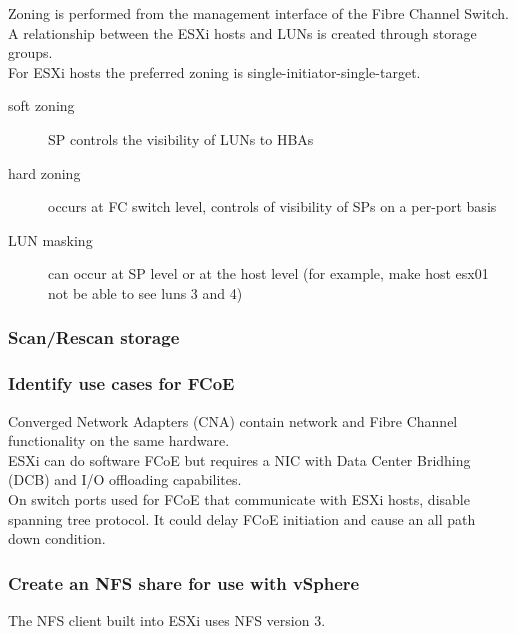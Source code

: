 Zoning is performed from the management interface of the Fibre Channel Switch.\\

A relationship between the ESXi hosts and LUNs is created through storage
groups.\\

For ESXi hosts the preferred zoning is single-initiator-single-target.

\begin{description}

\item[soft zoning]
SP controls the visibility of LUNs to HBAs

\item[hard zoning]
occurs at FC switch level, controls of visibility of SPs on a per-port basis

\item[LUN masking]
can occur at SP level or at the host level (for example, make host esx01 not be
able to see luns 3 and 4)

\end{description}

\subsubsection{Scan/Rescan storage}

\subsubsection{Identify use cases for FCoE}

Converged Network Adapters (CNA) contain network and Fibre Channel
functionality on the same hardware.\\

ESXi can do software FCoE but requires a NIC with Data Center Bridhing (DCB)
and I/O offloading capabilites.\\

On switch ports used for FCoE that communicate with ESXi hosts, disable
spanning tree protocol. It could delay FCoE initiation and cause an all
path down condition.

\subsubsection{Create an NFS share for use with vSphere}

The NFS client built into ESXi uses NFS version 3.\\

